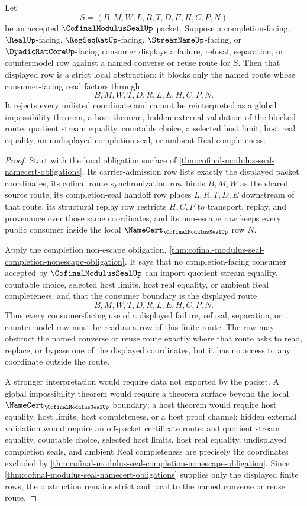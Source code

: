 \begin{corollary}
\label{cor:cofinal-modulus-seal-strict-obstruction}
Let
$$
S=(B,M,W,L,R,T,D,E,H,C,P,N)
$$
be an accepted $\CofinalModulusSealUp$ packet. Suppose a completion-facing, $\RealUp$-facing, $\RegSeqRatUp$-facing, $\StreamNameUp$-facing, or $\DyadicRatCoreUp$-facing consumer displays a failure, refusal, separation, or countermodel row against a named converse or reuse route for $S$. Then that displayed row is a strict local obstruction: it blocks only the named route whose consumer-facing read factors through
$$
B,M,W,T,D,R,L,E,H,C,P,N.
$$
It rejects every unlisted coordinate and cannot be reinterpreted as a global impossibility theorem, a host theorem, hidden external validation of the blocked route, quotient stream equality, countable choice, a selected host limit, host real equality, an undisplayed completion seal, or ambient Real completeness.
\end{corollary}
\begin{proof}
Start with the local obligation surface of \autoref{thm:cofinal-modulus-seal-namecert-obligations}. Its carrier-admission row lists exactly the displayed packet coordinates, its cofinal route synchronization row binds $B,M,W$ as the shared source route, its completion-seal handoff row places $L,R,T,D,E$ downstream of that route, its structural replay row restricts $H,C,P$ to transport, replay, and provenance over those same coordinates, and its non-escape row keeps every public consumer inside the local $\NameCert_{\CofinalModulusSealUp}$ row $N$.

Apply the completion non-escape obligation, \autoref{thm:cofinal-modulus-seal-completion-nonescape-obligation}. It says that no completion-facing consumer accepted by $\CofinalModulusSealUp$ can import quotient stream equality, countable choice, selected host limits, host real equality, or ambient Real completeness, and that the consumer boundary is the displayed route
$$
B,M,W,T,D,R,L,E,H,C,P,N.
$$
Thus every consumer-facing use of a displayed failure, refusal, separation, or countermodel row must be read as a row of this finite route. The row may obstruct the named converse or reuse route exactly where that route asks to read, replace, or bypass one of the displayed coordinates, but it has no access to any coordinate outside the route.

A stronger interpretation would require data not exported by the packet. A global impossibility theorem would require a theorem surface beyond the local $\NameCert_{\CofinalModulusSealUp}$ boundary; a host theorem would require host equality, host limits, host completeness, or a host proof channel; hidden external validation would require an off-packet certificate route; and quotient stream equality, countable choice, selected host limits, host real equality, undisplayed completion seals, and ambient Real completeness are precisely the coordinates excluded by \autoref{thm:cofinal-modulus-seal-completion-nonescape-obligation}. Since \autoref{thm:cofinal-modulus-seal-namecert-obligations} supplies only the displayed finite rows, the obstruction remains strict and local to the named converse or reuse route.
\end{proof}

